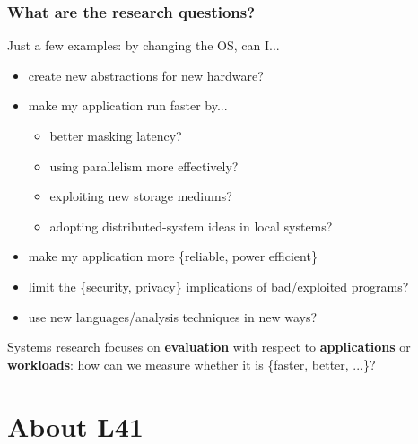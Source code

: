 \begin{frame}
  \frametitle{What are the research questions?}

  Just a few examples: by changing the OS, can I...
  \bigskip

  \begin{itemize}
    \item create new abstractions for new hardware?
    \item make my application run faster by...
    \begin{itemize}
      \item better masking latency?
      \item using parallelism more effectively?
      \item exploiting new storage mediums?
      \item adopting distributed-system ideas in local systems?
    \end{itemize}
    \item make my application more \{reliable, power efficient\}
    \item limit the \{security, privacy\} implications of bad/exploited
      programs?
    \item use new languages/analysis techniques in new ways?
  \end{itemize}

  \pause
  \bigskip
  Systems research focuses on \textbf{evaluation} with respect to
  \textbf{applications} or \textbf{workloads}: how can we measure whether it
  is \{faster, better, ...\}?
\end{frame}

\section{About L41}

